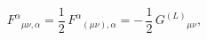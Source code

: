 \begin{equation}
F^{\alpha}{}_{\mu \nu,\alpha }=\frac{1}{2}\,F^{\alpha}{}_{(\mu\nu),\alpha}=
-\,\frac{1}{2}\,G^{(L)}{}_{\mu \nu },  \label{01888}
\end{equation}

